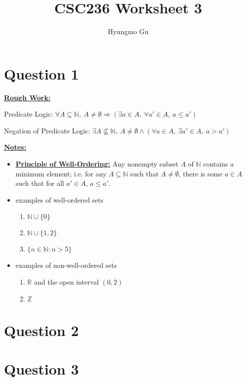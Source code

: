 \documentclass[12pt]{article}
\begin{document}
\title{CSC236 Worksheet 3}
\author{Hyungmo Gu}
\maketitle

\section*{Question 1}

\bigskip

\begin{mdframed}
    \underline{\textbf{Rough Work:}}

    \bigskip

    Predicate Logic: $\forall A \subseteq \mathbb{N},\:A \neq \emptyset \Rightarrow
    (\exists a \in A, \: \forall a' \in A,\: a \leq a')$

    \bigskip

    Negation of Predicate Logic: $\exists A \not\subseteq \mathbb{N},\:A \neq \emptyset \land
    (\forall a \in A, \: \exists a' \in A,\:a > a')$

    \bigskip

\end{mdframed}

\bigskip

\underline{\textbf{Notes:}}

\begin{itemize}
    \item \underline{\textbf{Principle of Well-Ordering:}} Any nonempty subset $A$
    of $\mathbb{N}$ contains a minimum element; i.e. for any $A \subseteq \mathbb{N}$
    such that $A \neq \emptyset$, there is some $a \in A$ such that for all $a' \in A$, $a \leq a'$.

    \item examples of well-ordered sets
    \begin{enumerate}[1.]
        \item $\mathbb{N} \cup \{0\}$
        \item $\mathbb{N} \cup \{1,2\}$
        \item $\{n \in \mathbb{N}: n > 5\}$
    \end{enumerate}
    \item examples of non-well-ordered sets
    \begin{enumerate}[1.]
        \item $\mathbb{R}$ and the open interval $(0,2)$
        \item $\mathbb{Z}$
    \end{enumerate}
\end{itemize}

\section*{Question 2}

\section*{Question 3}
\end{document}
